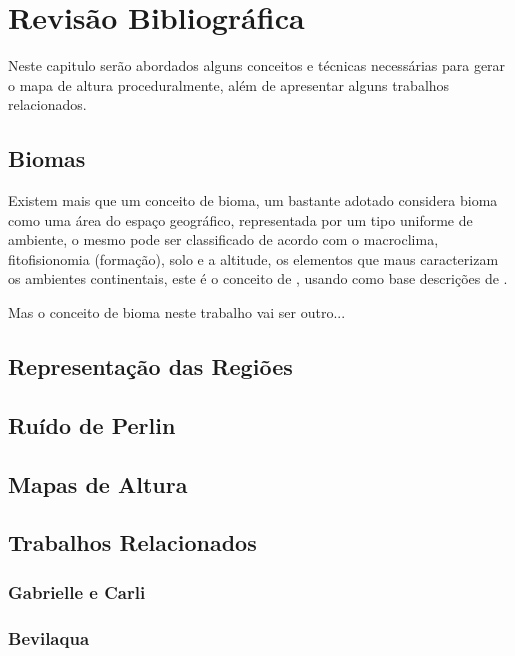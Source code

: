 \chapter{Revisão Bibliográfica}
Neste capitulo serão abordados alguns conceitos e técnicas necessárias para
gerar o mapa de altura proceduralmente, além de apresentar alguns trabalhos
relacionados.

\section{Biomas}
Existem mais que um conceito de bioma, um bastante adotado considera bioma como
uma área do espaço geográfico, representada por um tipo uniforme de ambiente, o
mesmo pode ser classificado de acordo com o macroclima, fitofisionomia (formação),
solo e a altitude, os elementos que maus caracterizam os ambientes continentais, 
este é o conceito de \cite{coutinho2006conceito}, usando como base descrições
de \cite{walter1986vegetaccao}.

Mas o conceito de bioma neste trabalho vai ser outro...%


\section{Representação das Regiões}

\section{Ruído de Perlin}

\section{Mapas de Altura}

\section{Trabalhos Relacionados}

\subsection{Gabrielle e Carli}

\subsection{Bevilaqua}